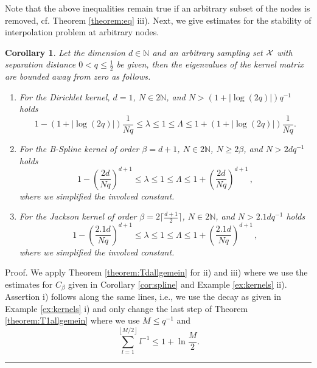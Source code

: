 \documentclass[11pt,a4paper,bibtotoc]{scrartcl}
\def\N{\mathbb{N}}
\newcommand{\Boxgl}{\par\vspace{-5ex} \hspace*{0ex} \hfill
  \rule{1.5ex}{1.5ex} \\ \goodbreak\goodbreak}
\newtheorem{corollary}[theorem]{Corollary}
\newenvironment{Corollary}{\goodbreak \begin{corollary}\rm}{\end{corollary}}
\numberwithin{equation}{section}
\numberwithin{table}{section}
\numberwithin{figure}{section}
\begin{document}
Note that the above inequalities remain true if an arbitrary subset of the
nodes is removed, cf. Theorem \ref{theorem:eq} iii).
Next, we give estimates for the stability of interpolation problem at
arbitrary nodes.
\begin{Corollary}  \label{cor:qsep}
  Let the dimension $d\in\N$ and an arbitrary sampling set $\cal X$ with
  separation distance $0<q\le\frac{1}{2}$ be given, then the eigenvalues of the
  kernel matrix are bounded away from zero as follows.
  \begin{enumerate}
  \item For the Dirichlet kernel, $d=1$, $N\in 2\N$, and
    $N>\left(1+\left|\log\left(2q\right)\right|\right)q^{-1}$ holds 
    \begin{equation*}
      1- \left(1+\left|\log\left(2q\right)\right|\right)\frac{1}{Nq}
      \le \lambda \le 1 \le \Lambda \le
      1+ \left(1+\left|\log\left(2q\right)\right|\right)\frac{1}{Nq}.
    \end{equation*}
  \item For the B-Spline kernel of order $\beta=d+1$, $N\in 2\N$, $N\ge
    2\beta$, and $N>2dq^{-1}$ holds
    \begin{equation*}
      1- \left(\frac{2d}{Nq}\right)^{d+1}
      \le \lambda \le 1 \le \Lambda \le
      1+ \left(\frac{2d}{Nq}\right)^{d+1}\,,
    \end{equation*}
    where we simplified the involved constant.
  \item For the Jackson kernel of order $\beta=2\lceil\frac{d+1}{2}\rceil$,
    $N\in 2\N$, and $N>2.1 d q^{-1}$ holds
    \begin{equation*}
      1- \left(\frac{2.1d}{Nq}\right)^{d+1}
      \le \lambda \le 1 \le \Lambda \le
      1+ \left(\frac{2.1d}{Nq}\right)^{d+1}\,,
    \end{equation*}
    where we simplified the involved constant.
  \end{enumerate}
\end{Corollary}

Proof. We apply Theorem \ref{theorem:Tdallgemein} for ii) and iii) where we
 use the estimates for $C_{\beta}$ given in Corollary \ref{cor:spline} and
 Example \ref{ex:kernels} ii).
 Assertion i) follows along the same lines, i.e., we use the decay as given in
 Example \ref{ex:kernels} i) and only change the last step of Theorem
 \ref{theorem:T1allgemein} where we use $M\le q^{-1}$ and
 \begin{equation*}
   \sum\limits_{l=1}^{\left\lfloor M/2\right\rfloor} l^{-1} \le 1+\ln
   \frac{M}{2}.
 \end{equation*}
\Boxgl
\end{document}
